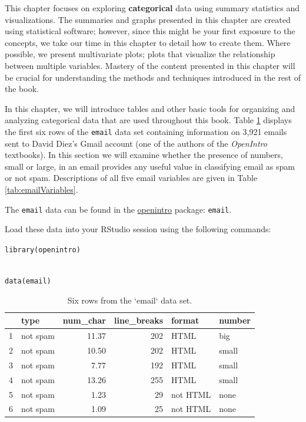 \documentclass[
  10pt,
  openany]{book}
\theoremstyle{definition}
\theoremstyle{definition}
\theoremstyle{definition}
\theoremstyle{definition}
\theoremstyle{remark}
\begin{document}
This chapter focuses on exploring \textbf{categorical} data using summary statistics and visualizations.
The summaries and graphs presented in this chapter are created using statistical software; however, since this might be your first exposure to the concepts, we take our time in this chapter to detail how to create them.
Where possible, we present multivariate plots; plots that visualize the relationship between multiple variables.
Mastery of the content presented in this chapter will be crucial for understanding the methods and techniques introduced in the rest of the book.

In this chapter, we will introduce tables and other basic tools for organizing and analyzing categorical data that are used throughout this book. Table \ref{tab:emailDF} displays the first six rows of the \texttt{email} data set containing information on 3,921 emails sent to David Diez's Gmail account (one of the authors of the \emph{OpenIntro} textbooks). In this section we will examine whether the presence of numbers, small or large, in an email provides any useful value in classifying email as spam or not spam.
Descriptions of all five email variables are given in Table \ref{tab:emailVariables}.

The \texttt{email} data can be found in the \href{http://openintrostat.github.io/openintro/reference/index.html}{openintro} package: \texttt{email}.

Load these data into your RStudio session using the following commands:

\texttt{library(openintro)}\strut \\
\texttt{data(email)}

\begin{table}

\caption{\label{tab:emailDF}Six rows from the `email` data set.}
\centering
\begin{tabular}[t]{l|l|r|r|l|l}
\hline
  & type & num\_char & line\_breaks & format & number\\
\hline
1 & not spam & 11.37 & 202 & HTML & big\\
\hline
2 & not spam & 10.50 & 202 & HTML & small\\
\hline
3 & not spam & 7.77 & 192 & HTML & small\\
\hline
4 & not spam & 13.26 & 255 & HTML & small\\
\hline
5 & not spam & 1.23 & 29 & not HTML & none\\
\hline
6 & not spam & 1.09 & 25 & not HTML & none\\
\hline
\end{tabular}
\end{table}
\end{document}
